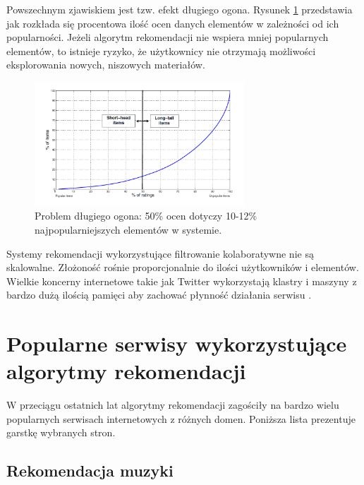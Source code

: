 \documentclass[twoside]{iisthesis}
\begin{document}
	 Powszechnym zjawiskiem jest tzw. efekt długiego ogona. Rysunek \ref{fig:longtail} przedstawia jak rozkłada się procentowa ilość ocen danych elementów w zależności od ich popularności. Jeżeli algorytm rekomendacji nie wspiera mniej popularnych elementów, to istnieje ryzyko, że użytkownicy nie otrzymają możliwości eksplorowania nowych, niszowych materiałów\cite{id:RubensRecSysHB2010}\cite{id:celma2010music}.
	 
  \begin{figure}[!ht] 
 	  	\centering
 	  	\includegraphics[width=0.7\textwidth]{longtail}
 	  	\caption{Problem długiego ogona: 50\% ocen dotyczy 10-12\% najpopularniejszych elementów w systemie\protect\cite{id:RubensRecSysHB2010}.}
 	  	\label{fig:longtail}
  \end{figure}
	 
	 Systemy rekomendacji wykorzystujące filtrowanie kolaboratywne nie są skalowalne. Złożoność rośnie proporcjonalnie do ilości użytkowników i elementów. Wielkie koncerny internetowe takie jak Twitter wykorzystają klastry i maszyny z bardzo dużą ilością pamięci aby zachować płynność działania serwisu \cite{id:gupta2013wtf}.
	 
	 \section{Popularne serwisy wykorzystujące algorytmy rekomendacji}
	 
		W przeciągu ostatnich lat algorytmy rekomendacji zagościły na bardzo wielu popularnych serwisach internetowych z różnych domen. Poniższa lista prezentuje garstkę wybranych stron. 
	 
		 \subsection{Rekomendacja muzyki}
	 
\end{document}
